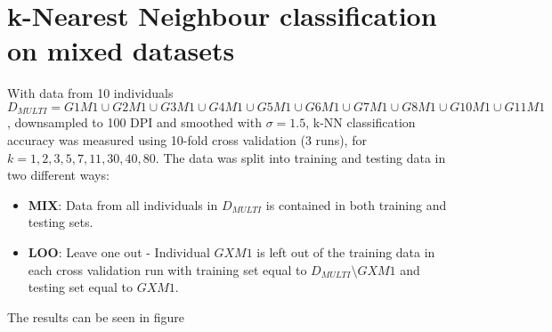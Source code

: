 \section{k-Nearest Neighbour classification on mixed datasets}
\label{sec:knnmulti}
With data from 10 individuals
\(D_{MULTI}=G1M1\cup G2M1\cup G3M1\cup G4M1\cup G5M1\cup G6M1\cup G7M1\cup G8M1\cup G10M1\cup G11M1\),
downsampled to 100 DPI and smoothed with \(\sigma=1.5\),
k-NN classification accuracy was measured using 10-fold cross validation (3 runs),
for \(k=1,2,3,5,7,11,30,40,80\).
The data was split into training and testing data in two different ways:
\begin{itemize}
	\item \textbf{MIX}: Data from all individuals in \(D_{MULTI}\)
	is contained in both training and testing sets.
	\item \textbf{LOO}: Leave one out - Individual \(GXM1\) is
	left out of the training data in each cross validation run with
	training set equal to \(D_{MULTI}\setminus GXM1\) and testing set equal to \(GXM1\).
\end{itemize}
The results can be seen in figure

